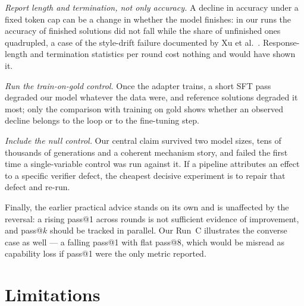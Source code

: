 \documentclass[runningheads]{llncs}
\begin{document}
\emph{Report length and termination, not only accuracy.} A decline in
accuracy under a fixed token cap can be a change in whether the model finishes:
in our runs the accuracy of finished solutions did not fall while the share of
unfinished ones quadrupled, a case of the style-drift failure documented by
Xu et al.~\cite{ref_phantom}. Response-length and termination statistics per
round cost nothing and would have shown it.

\emph{Run the train-on-gold control.} Once the adapter trains, a short SFT pass
degraded our model whatever the data were, and reference solutions degraded it
most; only the comparison with training on gold shows whether an observed
decline belongs to the loop or to the fine-tuning step.

\emph{Include the null control.} Our central claim survived two model
sizes, tens of thousands of generations and a coherent mechanism story, and
failed the first time a single-variable control was run against it. If a
pipeline attributes an effect to a specific verifier defect, the cheapest
decisive experiment is to repair that defect and re-run.

Finally, the earlier practical advice stands on its own and is unaffected
by the reversal: a rising pass@1 across rounds is not sufficient evidence
of improvement, and pass@$k$ should be tracked in parallel. Our Run~C
illustrates the converse case as well --- a falling pass@1 with flat
pass@8, which would be misread as capability loss if pass@1 were the only
metric reported.

\section{Limitations}
\label{sec:limitations}
\end{document}
